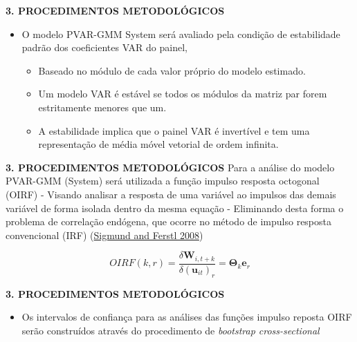 \documentclass[
  ignorenonframetext,
  aspectratio=169,
  ignorenonframetext]{beamer}
\providecommand{\tightlist}{%
  \setlength{\itemsep}{0pt}\setlength{\parskip}{0pt}}
\begin{document}
\begin{frame}{\textbf{3. PROCEDIMENTOS METODOLÓGICOS}}
\protect\hypertarget{procedimentos-metodoluxf3gicos-11}{}
\begin{itemize}
\tightlist
\item
  O modelo PVAR-GMM System será avaliado pela condição de estabilidade
  padrão dos coeficientes VAR do painel,

  \begin{itemize}
  \tightlist
  \item
    Baseado no módulo de cada valor próprio do modelo estimado.
  \item
    Um modelo VAR é estável se todos os módulos da matriz par forem
    estritamente menores que um.
  \item
    A estabilidade implica que o painel VAR é invertível e tem uma
    representação de média móvel vetorial de ordem infinita.
  \end{itemize}
\end{itemize}
\end{frame}

\begin{frame}{\textbf{3. PROCEDIMENTOS METODOLÓGICOS}}
\protect\hypertarget{procedimentos-metodoluxf3gicos-12}{}
Para a análise do modelo PVAR-GMM (System) será utilizada a função
impulso resposta octogonal (OIRF) - Visando analisar a resposta de uma
variável ao impulsos das demais variável de forma isolada dentro da
mesma equação - Eliminando desta forma o problema de correlação
endógena, que ocorre no método de impulso resposta convencional (IRF)
(\protect\hyperlink{ref-sigmund:2008}{Sigmund and Ferstl 2008})

\begin{equation}\label{eq:oirf}
OIRF(k,r) = \frac{\delta\mathbf{W}_{i,t+k}}{\delta(\mathbf{u}_{it})_{r}} = \mathbf{\Theta}_{k}\mathbf{e}_{r}  
\end{equation}
\end{frame}

\begin{frame}{\textbf{3. PROCEDIMENTOS METODOLÓGICOS}}
\protect\hypertarget{procedimentos-metodoluxf3gicos-13}{}
\begin{itemize}
\tightlist
\item
  Os intervalos de confiança para as análises das funções impulso
  reposta OIRF serão construídos através do procedimento de
  \emph{bootstrap cross-sectional}
\end{itemize}
\end{frame}
\end{document}
